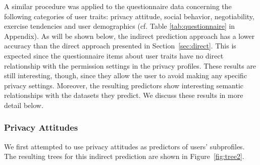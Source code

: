 A similar procedure was applied to the questionnaire data concerning the following categories of user traits: privacy attitude, social behavior, negotiability, exercise tendencies and  user demographics (cf. Table \ref{tab:questionnaire} in Appendix).
As will be shown below, the indirect prediction approach has a lower accuracy than the direct approach presented in Section~\ref{sec:direct}. This is expected since the questionnaire items about user traits have no direct relationship with the permission settings in the privacy profiles.
These results are still interesting, though, since they allow the user to avoid making any specific privacy settings. Moreover, the resulting predictors show interesting semantic relationships with the datasets they predict. We discuss these results in more detail below.

\subsubsection{Privacy Attitudes}

We first attempted to use privacy attitudes as predictors of users' subprofiles. The resulting trees for this indirect prediction are shown in Figure~\ref{fig:tree2}.


